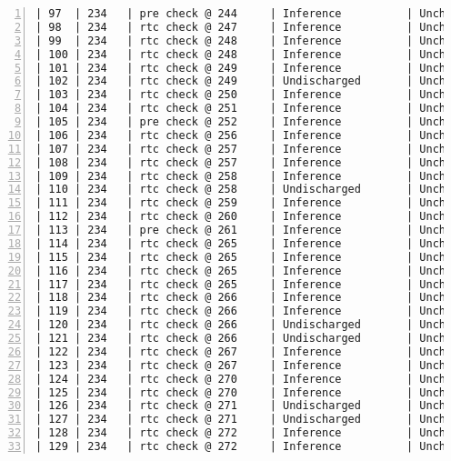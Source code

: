 \begin{lstlisting}[gobble=0, numbers=left, caption={POGS report for PCA Pump prototype}, label={listing:pca_ravenscar:pogs_full}]
| 97  | 234   | pre check @ 244     | Inference          | Unchecked |   IU   |
| 98  | 234   | rtc check @ 247     | Inference          | Unchecked |   IU   |
| 99  | 234   | rtc check @ 248     | Inference          | Unchecked |   IU   |
| 100 | 234   | rtc check @ 248     | Inference          | Unchecked |   IU   |
| 101 | 234   | rtc check @ 249     | Inference          | Unchecked |   IU   |
| 102 | 234   | rtc check @ 249     | Undischarged       | Unchecked |   UU   |
| 103 | 234   | rtc check @ 250     | Inference          | Unchecked |   IU   |
| 104 | 234   | rtc check @ 251     | Inference          | Unchecked |   IU   |
| 105 | 234   | pre check @ 252     | Inference          | Unchecked |   IU   |
| 106 | 234   | rtc check @ 256     | Inference          | Unchecked |   IU   |
| 107 | 234   | rtc check @ 257     | Inference          | Unchecked |   IU   |
| 108 | 234   | rtc check @ 257     | Inference          | Unchecked |   IU   |
| 109 | 234   | rtc check @ 258     | Inference          | Unchecked |   IU   |
| 110 | 234   | rtc check @ 258     | Undischarged       | Unchecked |   UU   |
| 111 | 234   | rtc check @ 259     | Inference          | Unchecked |   IU   |
| 112 | 234   | rtc check @ 260     | Inference          | Unchecked |   IU   |
| 113 | 234   | pre check @ 261     | Inference          | Unchecked |   IU   |
| 114 | 234   | rtc check @ 265     | Inference          | Unchecked |   IU   |
| 115 | 234   | rtc check @ 265     | Inference          | Unchecked |   IU   |
| 116 | 234   | rtc check @ 265     | Inference          | Unchecked |   IU   |
| 117 | 234   | rtc check @ 265     | Inference          | Unchecked |   IU   |
| 118 | 234   | rtc check @ 266     | Inference          | Unchecked |   IU   |
| 119 | 234   | rtc check @ 266     | Inference          | Unchecked |   IU   |
| 120 | 234   | rtc check @ 266     | Undischarged       | Unchecked |   UU   |
| 121 | 234   | rtc check @ 266     | Undischarged       | Unchecked |   UU   |
| 122 | 234   | rtc check @ 267     | Inference          | Unchecked |   IU   |
| 123 | 234   | rtc check @ 267     | Inference          | Unchecked |   IU   |
| 124 | 234   | rtc check @ 270     | Inference          | Unchecked |   IU   |
| 125 | 234   | rtc check @ 270     | Inference          | Unchecked |   IU   |
| 126 | 234   | rtc check @ 271     | Undischarged       | Unchecked |   UU   |
| 127 | 234   | rtc check @ 271     | Undischarged       | Unchecked |   UU   |
| 128 | 234   | rtc check @ 272     | Inference          | Unchecked |   IU   |
| 129 | 234   | rtc check @ 272     | Inference          | Unchecked |   IU   |

\end{lstlisting}
